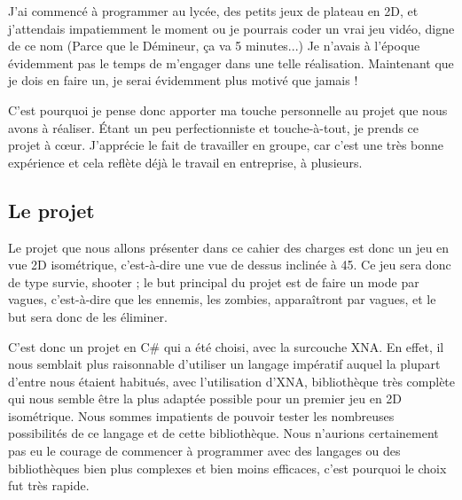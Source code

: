 \documentclass{article}
\begin{document}
\par
J'ai commencé à programmer au lycée, des petits jeux de plateau en 2D, et j'attendais impatiemment le moment ou je pourrais coder un vrai jeu vidéo, digne de ce nom (Parce que le Démineur, ça va 5 minutes...) Je n'avais à l'époque évidemment pas le temps de m'engager dans une telle réalisation. Maintenant que je dois en faire un, je serai évidemment plus motivé que jamais !
\newline

\par
C'est pourquoi je pense donc apporter ma touche personnelle au projet que nous avons à réaliser. Étant un peu perfectionniste et touche-à-tout, je prends ce projet à cœur. J'apprécie le fait de travailler en groupe, car c'est une très bonne expérience et cela reflète déjà le travail en entreprise, à plusieurs.
\newline



\newpage
\subsection{Le projet}

\par
Le projet que nous allons présenter dans ce cahier des charges est donc un jeu en vue 2D isométrique, c'est-à-dire une vue de dessus inclinée à 45\textdegree. Ce jeu sera donc de type survie, shooter ; le but principal du projet est de faire un mode par vagues, c'est-à-dire que les ennemis, les zombies, apparaîtront par vagues, et le but sera donc de les éliminer.
\newline

\par
C'est donc un projet en C\# qui a été choisi, avec la surcouche XNA. En effet, il nous semblait plus raisonnable d'utiliser un langage impératif auquel la plupart d'entre nous étaient habitués, avec l'utilisation d'XNA, bibliothèque très complète qui nous semble être la plus adaptée possible pour un premier jeu en 2D isométrique. Nous sommes impatients de pouvoir tester les nombreuses possibilités de ce langage et de cette bibliothèque. Nous n'aurions certainement pas eu le courage de commencer à programmer avec des langages ou des bibliothèques bien plus complexes et bien moins efficaces, c'est pourquoi le choix fut très rapide.
\newline
\end{document}
